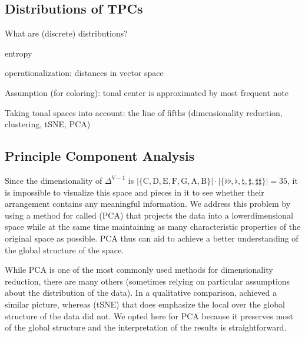 \documentclass[letterpaper,10pt,english]{sphinxmanual}
\begin{document}
\subsection{Distributions of TPCs}
\label{\detokenize{tonality:distributions-of-tpcs}}
What are (discrete) distributions?

entropy


operationalization: distances in vector space

Assumption (for coloring): tonal center is approximated by most frequent note

Taking tonal spaces into account: the line of fifths (dimensionality reduction, clustering, t\sphinxhyphen{}SNE, PCA)


\subsection{Principle Component Analysis}
\label{\detokenize{tonality:principle-component-analysis}}
Since the dimensionality of \(\Delta^{V-1}\) is
\(|\{\text{C}, \text{D}, \text{E}, \text{F}, \text{G}, \text{A}, \text{B}\}| \cdot |\{\flat\flat, \flat, \natural, \sharp, \sharp\sharp\}| = 35\), it is impossible to visualize
this space and pieces in it to see whether their arrangement contains any meaningful information.
We address this problem by using a method for 
called  (PCA) 
that projects the data into a lower\sphinxhyphen{}dimensional space while at the same time maintaining
as many characteristic properties of the original space as possible.
PCA thus can aid to achieve a better understanding of
the global structure of the space. %
\begin{footnote}[1]\sphinxAtStartFootnote
While PCA is one of the most commonly used methods for dimensionality reduction, there are many others
(sometimes relying on particular assumptions about the distribution of the data).
In a qualitative comparison,   achieved a similar picture,
whereas  (t\sphinxhyphen{}SNE) 
that does emphasize the local over the global structure of the data did not.
We opted here for PCA because it preserves most
of the global structure and the interpretation of the results is straight\sphinxhyphen{}forward.
%
\end{footnote}
\end{document}
